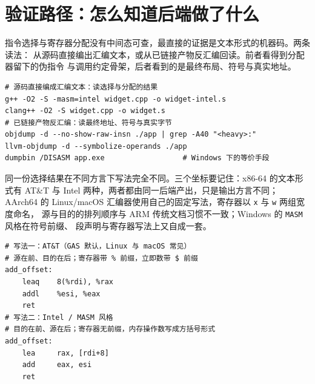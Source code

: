 \documentclass[12pt,a4paper,fontset=fandol]{ctexbook}
\newcommand{\Tool}[1]{\texttt{#1}}
\newcommand{\Sym}[1]{\texttt{#1}}
\newcommand{\Nix}{\textsf{Linux}}
\newcommand{\Win}{\textsf{Windows}}
\newcommand{\Mac}{\textsf{macOS}}
\newcommand{\xSixtyFour}{\textsf{x86-64}}
\newcommand{\ArmSixtyFour}{\textsf{AArch64}}
\begin{document}
\section{验证路径：怎么知道后端做了什么}\label{sec:cl06-verify}

指令选择与寄存器分配没有中间态可查，最直接的证据是文本形式的机器码。两条读法：
从源码直接编出汇编文本，或从已链接产物反汇编回读。前者看得到分配器留下的伪指令
与调用约定骨架，后者看到的是最终布局、符号与真实地址。

\begin{lstlisting}[style=shellstyle, caption={两条读法：源到汇编、产物到反汇编（示意命令）}]
# 源码直接编成汇编文本：读选择与分配的结果
g++ -O2 -S -masm=intel widget.cpp -o widget-intel.s
clang++ -O2 -S widget.cpp -o widget.s
# 已链接产物反汇编：读最终地址、符号与真实字节
objdump -d --no-show-raw-insn ./app | grep -A40 "<heavy>:"
llvm-objdump -d --symbolize-operands ./app
dumpbin /DISASM app.exe                  # Windows 下的等价手段
\end{lstlisting}

同一份选择结果在不同方言下写法完全不同。三个坐标要记住：\xSixtyFour{} 的文本形式有
AT\&T 与 Intel 两种，两者都由同一后端产出，只是输出方言不同；\ArmSixtyFour{} 的
\Nix{}/\Mac{} 汇编器使用自己的固定写法，寄存器以 \Sym{x} 与 \Sym{w} 两组宽度命名，
源与目的的排列顺序与 ARM 传统文档习惯不一致；\Win{} 的 \Tool{MASM} 风格在符号前缀、
段声明与寄存器写法上又自成一套。

\begin{lstlisting}[style=asmstyle, caption={同一函数两种 x86-64 方言的对照（示意，非编译器实测输出）}]
# 写法一：AT&T（GAS 默认，Linux 与 macOS 常见）
# 源在前、目的在后；寄存器带 % 前缀，立即数带 $ 前缀
add_offset:
    leaq    8(%rdi), %rax
    addl    %esi, %eax
    ret
# 写法二：Intel / MASM 风格
# 目的在前、源在后；寄存器无前缀，内存操作数写成方括号形式
add_offset:
    lea     rax, [rdi+8]
    add     eax, esi
    ret
\end{lstlisting}
\end{document}
